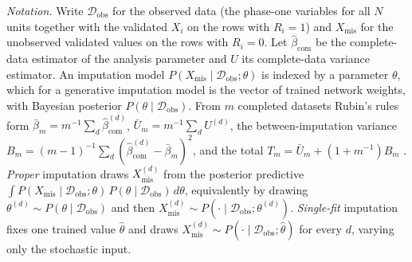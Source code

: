 \emph{Notation.} Write $\mathcal{D}_{\mathrm{obs}}$ for the observed data (the phase-one variables for all $N$ units together with the validated $X_i$ on the rows with $R_i=1$) and $X_{\mathrm{mis}}$ for the unobserved validated values on the rows with $R_i=0$. Let $\hat{\beta}_{\mathrm{com}}$ be the complete-data estimator of the analysis parameter and $U$ its complete-data variance estimator. An imputation model $P(X_{\mathrm{mis}}\mid\mathcal{D}_{\mathrm{obs}};\theta)$ is indexed by a parameter $\theta$, which for a generative imputation model is the vector of trained network weights, with Bayesian posterior $P(\theta\mid\mathcal{D}_{\mathrm{obs}})$. From $m$ completed datasets Rubin's rules form $\bar{\beta}_m=m^{-1}\sum_d\hat{\beta}^{(d)}_{\mathrm{com}}$, $\bar{U}_m=m^{-1}\sum_d U^{(d)}$, the between-imputation variance $B_m=(m-1)^{-1}\sum_d(\hat{\beta}^{(d)}_{\mathrm{com}}-\bar{\beta}_m)^2$, and the total $T_m=\bar{U}_m+(1+m^{-1})B_m$ \citep{Rubin1987}. \emph{Proper} imputation draws $X_{\mathrm{mis}}^{(d)}$ from the posterior predictive $\int P(X_{\mathrm{mis}}\mid\mathcal{D}_{\mathrm{obs}};\theta)\,P(\theta\mid\mathcal{D}_{\mathrm{obs}})\,d\theta$, equivalently by drawing $\theta^{(d)}\sim P(\theta\mid\mathcal{D}_{\mathrm{obs}})$ and then $X_{\mathrm{mis}}^{(d)}\sim P(\cdot\mid\mathcal{D}_{\mathrm{obs}};\theta^{(d)})$. \emph{Single-fit} imputation fixes one trained value $\hat{\theta}$ and draws $X_{\mathrm{mis}}^{(d)}\sim P(\cdot\mid\mathcal{D}_{\mathrm{obs}};\hat{\theta})$ for every $d$, varying only the stochastic input.

